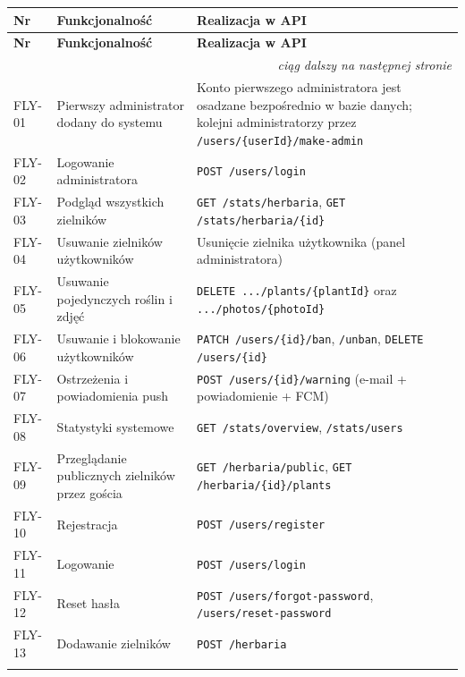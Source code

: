 \documentclass[12pt,a4paper]{article}
\begin{document}
\begin{small}
\begin{longtable}{@{}p{1.4cm}p{4.6cm}p{8.0cm}@{}}
\toprule
\textbf{Nr} & \textbf{Funkcjonalno\'s\'c} & \textbf{Realizacja w API} \\
\midrule
\endfirsthead
\toprule
\textbf{Nr} & \textbf{Funkcjonalno\'s\'c} & \textbf{Realizacja w API} \\
\midrule
\endhead
\midrule
\multicolumn{3}{r}{\textit{ci\k{a}g dalszy na nast\k{e}pnej stronie}} \\
\endfoot
\bottomrule
\endlastfoot
FLY-01 & Pierwszy administrator dodany do systemu & Konto pierwszego administratora jest osadzane bezpo\'srednio w bazie danych; kolejni administratorzy przez \texttt{/users/\{userId\}/make-admin} \\ \addlinespace
FLY-02 & Logowanie administratora & \texttt{POST /users/login} \\ \addlinespace
FLY-03 & Podgl\k{a}d wszystkich zielnik\'ow & \texttt{GET /stats/herbaria}, \texttt{GET /stats/herbaria/\{id\}} \\ \addlinespace
FLY-04 & Usuwanie zielnik\'ow u\.zytkownik\'ow & Usuni\k{e}cie zielnika u\.zytkownika (panel administratora) \\ \addlinespace
FLY-05 & Usuwanie pojedynczych ro\'slin i zdj\k{e}\'c & \texttt{DELETE .../plants/\{plantId\}} oraz \texttt{.../photos/\{photoId\}} \\ \addlinespace
FLY-06 & Usuwanie i blokowanie u\.zytkownik\'ow & \texttt{PATCH /users/\{id\}/ban}, \texttt{/unban}, \texttt{DELETE /users/\{id\}} \\ \addlinespace
FLY-07 & Ostrze\.zenia i powiadomienia push & \texttt{POST /users/\{id\}/warning} (e-mail + powiadomienie + FCM) \\ \addlinespace
FLY-08 & Statystyki systemowe & \texttt{GET /stats/overview}, \texttt{/stats/users} \\ \addlinespace
FLY-09 & Przegl\k{a}danie publicznych zielnik\'ow przez go\'scia & \texttt{GET /herbaria/public}, \texttt{GET /herbaria/\{id\}/plants} \\ \addlinespace
FLY-10 & Rejestracja & \texttt{POST /users/register} \\ \addlinespace
FLY-11 & Logowanie & \texttt{POST /users/login} \\ \addlinespace
FLY-12 & Reset has\l{}a & \texttt{POST /users/forgot-password}, \texttt{/users/reset-password} \\ \addlinespace
FLY-13 & Dodawanie zielnik\'ow & \texttt{POST /herbaria} \\ \addlinespace

\end{longtable}
\end{small}
\end{document}
